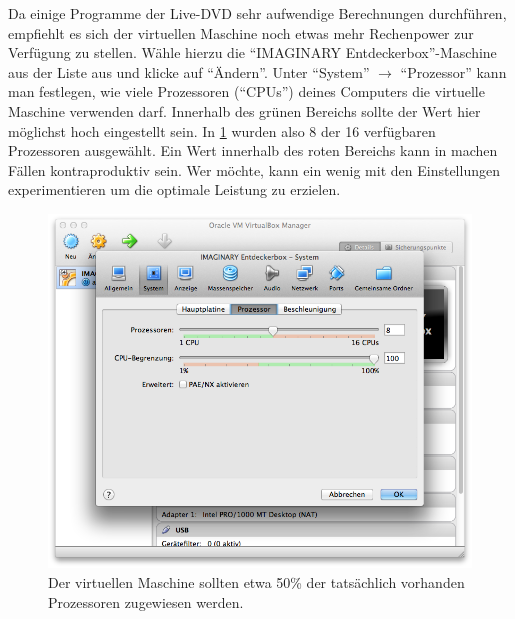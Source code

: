 \documentclass[a4paper,10pt,BCOR=0mm,DIV=14]{scrartcl}
\def\gfxscale{0.27}
\newcommand{\command}[1]{\textsf{\enquote{#1}}}
\begin{document}
Da einige Programme der Live-DVD sehr aufwendige Berechnungen durchführen, empfiehlt es sich der virtuellen Maschine noch etwas mehr Rechenpower zur Verfügung zu stellen. Wähle hierzu die \command{IMAGINARY Entdeckerbox}-Maschine aus der Liste aus und klicke auf \command{Ändern}. Unter \command{System} $\rightarrow$ \command{Prozessor} kann man festlegen, wie viele Prozessoren (\command{CPUs}) deines Computers die virtuelle Maschine verwenden darf. Innerhalb des grünen Bereichs sollte der Wert hier möglichst hoch eingestellt sein. In \cref{VBox60} wurden also 8 der 16 verfügbaren Prozessoren ausgewählt. Ein Wert innerhalb des roten Bereichs kann in machen Fällen kontraproduktiv sein. Wer möchte, kann ein wenig mit den Einstellungen experimentieren um die optimale Leistung zu erzielen. 
\begin{figure}[h]
\centering\includegraphics[scale=\gfxscale]{VBox60}
\caption{Der virtuellen Maschine sollten etwa 50\% der tatsächlich vorhanden Prozessoren zugewiesen werden.}
\label{VBox60}
\end{figure}
\end{document}
